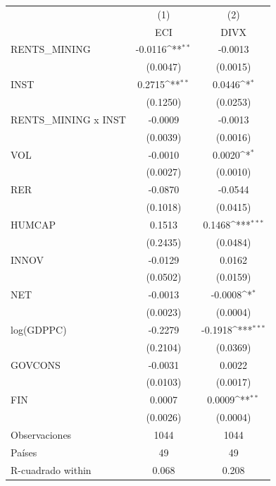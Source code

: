 {
\def\sym#1{\ifmmode^{#1}\else\(^{#1}\)\fi}
\begin{tabular}{l*{2}{c}}
\toprule
                    &\multicolumn{1}{c}{(1)}&\multicolumn{1}{c}{(2)}\\
                    &\multicolumn{1}{c}{ECI}&\multicolumn{1}{c}{DIVX}\\
\midrule
RENTS\_MINING        &     -0.0116\sym{**} &     -0.0013         \\
                    &    (0.0047)         &    (0.0015)         \\
\addlinespace
INST                &      0.2715\sym{**} &      0.0446\sym{*}  \\
                    &    (0.1250)         &    (0.0253)         \\
\addlinespace
RENTS\_MINING x INST &     -0.0009         &     -0.0013         \\
                    &    (0.0039)         &    (0.0016)         \\
\addlinespace
VOL                 &     -0.0010         &      0.0020\sym{*}  \\
                    &    (0.0027)         &    (0.0010)         \\
\addlinespace
RER                 &     -0.0870         &     -0.0544         \\
                    &    (0.1018)         &    (0.0415)         \\
\addlinespace
HUMCAP              &      0.1513         &      0.1468\sym{***}\\
                    &    (0.2435)         &    (0.0484)         \\
\addlinespace
INNOV               &     -0.0129         &      0.0162         \\
                    &    (0.0502)         &    (0.0159)         \\
\addlinespace
NET                 &     -0.0013         &     -0.0008\sym{*}  \\
                    &    (0.0023)         &    (0.0004)         \\
\addlinespace
log(GDPPC)          &     -0.2279         &     -0.1918\sym{***}\\
                    &    (0.2104)         &    (0.0369)         \\
\addlinespace
GOVCONS             &     -0.0031         &      0.0022         \\
                    &    (0.0103)         &    (0.0017)         \\
\addlinespace
FIN                 &      0.0007         &      0.0009\sym{**} \\
                    &    (0.0026)         &    (0.0004)         \\
\midrule
Observaciones       &        1044         &        1044         \\
Países              &          49         &          49         \\
R-cuadrado within   &       0.068         &       0.208         \\
\bottomrule
\end{tabular}
}

